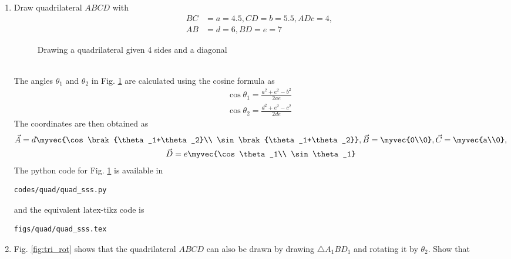 \renewcommand{\theequation}{\theenumi}
\begin{enumerate}[label=\arabic*.,ref=\thesubsection.\theenumi]

\item Draw quadrilateral $ABCD$ with 
\begin{align}
BC &= a = 4.5,  
CD = b = 5.5, 
AD c = 4,
\\  
AB &= d = 6,
BD = e = 7 
\end{align}
%
\begin{figure}[!ht]
	\begin{center}
			\resizebox{\columnwidth}{!}{}
	\end{center}
	\caption{Drawing a quadrilateral given 4 sides and a diagonal}
	\label{fig:quad_sss}	
\end{figure}
%
\\
\solution The angles $\theta_1$ and $\theta_2$ in Fig. 	\ref{fig:quad_sss}	
are calculated using the cosine formula as
\begin{align}
\label{eq:tri_rot_ang}
\cos \theta_1 = \frac{a^2+e^2-b^2}{2ae}
\\
\cos \theta_2 = \frac{d^2+e^2-c^2}{2de}
\end{align}
%
The coordinates are then obtained as
\begin{multline}
\label{eq:tri_basic_new}
\vec{A} = d\myvec{\cos \brak{\theta_1+\theta_2}\\ \sin \brak{\theta_1+\theta_2}}, \vec{B} = \myvec{0\\0}, \vec{C} = \myvec{a\\0}, 
\\
\vec{D} = e\myvec{\cos \theta_1\\ \sin \theta_1}
\end{multline}
%
The python code for Fig. \ref{fig:quad_sss}	is available in 
%
\begin{lstlisting}
codes/quad/quad_sss.py
\end{lstlisting}
and the equivalent latex-tikz code is
%
\begin{lstlisting}
figs/quad/quad_sss.tex
\end{lstlisting}
%
\item Fig. 	\ref{fig:tri_rot} shows that the quadrilateral $ABCD$ can also be drawn by drawing $\triangle A_1BD_1$ and rotating it by $\theta_2$. Show that 


\end{enumerate}
